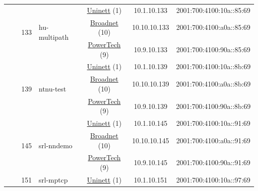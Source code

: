 \begin{small}
\begin{center}
\begin{longtable}{|c|c|c|c|c|c|c|c|}
  &  & \multirow{3}{*}{\tiny{133}} & \multicolumn{1}{|l|}{\multirow{3}{*}{\tiny{hu-multipath}}} & \multicolumn{2}{|c|}{\tiny{\href{https://www.uninett.no}{Uninett} (1)}} & \tiny{10.1.10.133} & \tiny{2001:700:4100:10a::85:69} \\* \cline{5-5}\cline{6-6}\cline{7-7}\cline{8-8}
  &  &  &  & \multicolumn{2}{|c|}{\tiny{\href{https://www.broadnet.no}{Broadnet} (10)}} & \tiny{10.10.10.133} & \tiny{2001:700:4100:a0a::85:69} \\* \cline{5-5}\cline{6-6}\cline{7-7}\cline{8-8}
  &  &  &  & \multicolumn{2}{|c|}{\tiny{\href{http://www.powertech.no}{PowerTech} (9)}} & \tiny{10.9.10.133} & \tiny{2001:700:4100:90a::85:69} \\* \cline{3-3}\cline{4-4}\cline{5-5}\cline{6-6}\cline{7-7}\cline{8-8}
  &  & \multirow{3}{*}{\tiny{139}} & \multicolumn{1}{|l|}{\multirow{3}{*}{\tiny{ntnu-test}}} & \multicolumn{2}{|c|}{\tiny{\href{https://www.uninett.no}{Uninett} (1)}} & \tiny{10.1.10.139} & \tiny{2001:700:4100:10a::8b:69} \\* \cline{5-5}\cline{6-6}\cline{7-7}\cline{8-8}
  &  &  &  & \multicolumn{2}{|c|}{\tiny{\href{https://www.broadnet.no}{Broadnet} (10)}} & \tiny{10.10.10.139} & \tiny{2001:700:4100:a0a::8b:69} \\* \cline{5-5}\cline{6-6}\cline{7-7}\cline{8-8}
  &  &  &  & \multicolumn{2}{|c|}{\tiny{\href{http://www.powertech.no}{PowerTech} (9)}} & \tiny{10.9.10.139} & \tiny{2001:700:4100:90a::8b:69} \\* \cline{3-3}\cline{4-4}\cline{5-5}\cline{6-6}\cline{7-7}\cline{8-8}
  &  & \multirow{3}{*}{\tiny{145}} & \multicolumn{1}{|l|}{\multirow{3}{*}{\tiny{srl-nndemo}}} & \multicolumn{2}{|c|}{\tiny{\href{https://www.uninett.no}{Uninett} (1)}} & \tiny{10.1.10.145} & \tiny{2001:700:4100:10a::91:69} \\* \cline{5-5}\cline{6-6}\cline{7-7}\cline{8-8}
  &  &  &  & \multicolumn{2}{|c|}{\tiny{\href{https://www.broadnet.no}{Broadnet} (10)}} & \tiny{10.10.10.145} & \tiny{2001:700:4100:a0a::91:69} \\* \cline{5-5}\cline{6-6}\cline{7-7}\cline{8-8}
  &  &  &  & \multicolumn{2}{|c|}{\tiny{\href{http://www.powertech.no}{PowerTech} (9)}} & \tiny{10.9.10.145} & \tiny{2001:700:4100:90a::91:69} \\* \cline{3-3}\cline{4-4}\cline{5-5}\cline{6-6}\cline{7-7}\cline{8-8}
  &  & \multirow{3}{*}{\tiny{151}} & \multicolumn{1}{|l|}{\multirow{3}{*}{\tiny{srl-mptcp}}} & \multicolumn{2}{|c|}{\tiny{\href{https://www.uninett.no}{Uninett} (1)}} & \tiny{10.1.10.151} & \tiny{2001:700:4100:10a::97:69} \\* \cline{5-5}\cline{6-6}\cline{7-7}\cline{8-8}

\end{longtable}
\end{center}
\end{small}
